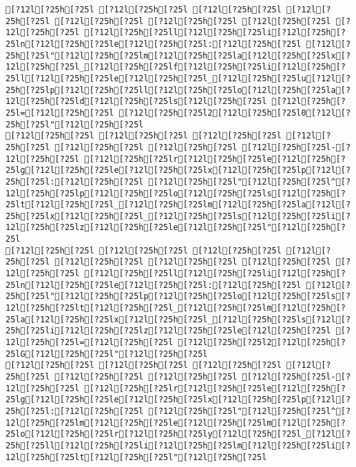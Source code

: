 \documentclass{scrartcl}
\begin{document}
\begin{Verbatim}
[?12l[?25h[?25l [?12l[?25h[?25l [?12l[?25h[?25l [?12l[?25h[?25l [?12l[?25h[?25l [?12l[?25h[?25l [?12l[?25h[?25l [?12l[?25h[?25l [?12l[?25h[?25ll[?12l[?25h[?25li[?12l[?25h[?25ln[?12l[?25h[?25le[?12l[?25h[?25l:[?12l[?25h[?25l [?12l[?25h[?25l"[?12l[?25h[?25lm[?12l[?25h[?25la[?12l[?25h[?25lx[?12l[?25h[?25l_[?12l[?25h[?25lf[?12l[?25h[?25li[?12l[?25h[?25ll[?12l[?25h[?25le[?12l[?25h[?25l_[?12l[?25h[?25lu[?12l[?25h[?25lp[?12l[?25h[?25ll[?12l[?25h[?25lo[?12l[?25h[?25la[?12l[?25h[?25ld[?12l[?25h[?25ls[?12l[?25h[?25l [?12l[?25h[?25l=[?12l[?25h[?25l [?12l[?25h[?25l2[?12l[?25h[?25l0[?12l[?25h[?25l"[?12l[?25h[?25l
[?12l[?25h[?25l [?12l[?25h[?25l [?12l[?25h[?25l [?12l[?25h[?25l [?12l[?25h[?25l [?12l[?25h[?25l [?12l[?25h[?25l-[?12l[?25h[?25l [?12l[?25h[?25lr[?12l[?25h[?25le[?12l[?25h[?25lg[?12l[?25h[?25le[?12l[?25h[?25lx[?12l[?25h[?25lp[?12l[?25h[?25l:[?12l[?25h[?25l [?12l[?25h[?25l"[?12l[?25h[?25l^[?12l[?25h[?25lp[?12l[?25h[?25lo[?12l[?25h[?25ls[?12l[?25h[?25lt[?12l[?25h[?25l_[?12l[?25h[?25lm[?12l[?25h[?25la[?12l[?25h[?25lx[?12l[?25h[?25l_[?12l[?25h[?25ls[?12l[?25h[?25li[?12l[?25h[?25lz[?12l[?25h[?25le[?12l[?25h[?25l"[?12l[?25h[?25l
[?12l[?25h[?25l [?12l[?25h[?25l [?12l[?25h[?25l [?12l[?25h[?25l [?12l[?25h[?25l [?12l[?25h[?25l [?12l[?25h[?25l [?12l[?25h[?25l [?12l[?25h[?25ll[?12l[?25h[?25li[?12l[?25h[?25ln[?12l[?25h[?25le[?12l[?25h[?25l:[?12l[?25h[?25l [?12l[?25h[?25l"[?12l[?25h[?25lp[?12l[?25h[?25lo[?12l[?25h[?25ls[?12l[?25h[?25lt[?12l[?25h[?25l_[?12l[?25h[?25lm[?12l[?25h[?25la[?12l[?25h[?25lx[?12l[?25h[?25l_[?12l[?25h[?25ls[?12l[?25h[?25li[?12l[?25h[?25lz[?12l[?25h[?25le[?12l[?25h[?25l [?12l[?25h[?25l=[?12l[?25h[?25l [?12l[?25h[?25l2[?12l[?25h[?25lG[?12l[?25h[?25l"[?12l[?25h[?25l
[?12l[?25h[?25l [?12l[?25h[?25l [?12l[?25h[?25l [?12l[?25h[?25l [?12l[?25h[?25l [?12l[?25h[?25l [?12l[?25h[?25l-[?12l[?25h[?25l [?12l[?25h[?25lr[?12l[?25h[?25le[?12l[?25h[?25lg[?12l[?25h[?25le[?12l[?25h[?25lx[?12l[?25h[?25lp[?12l[?25h[?25l:[?12l[?25h[?25l [?12l[?25h[?25l"[?12l[?25h[?25l^[?12l[?25h[?25lm[?12l[?25h[?25le[?12l[?25h[?25lm[?12l[?25h[?25lo[?12l[?25h[?25lr[?12l[?25h[?25ly[?12l[?25h[?25l_[?12l[?25h[?25ll[?12l[?25h[?25li[?12l[?25h[?25lm[?12l[?25h[?25li[?12l[?25h[?25lt[?12l[?25h[?25l"[?12l[?25h[?25l

\end{Verbatim}
\end{document}
